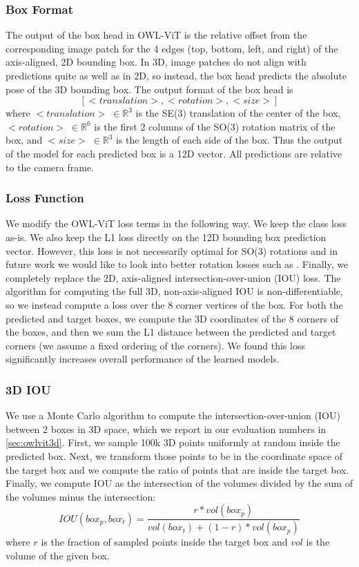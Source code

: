 \subsubsection{Box Format}
\label{app:owlvit3d_box_format}

The output of the box head in OWL-ViT is the relative offset from the corresponding image patch for the 4 edges (top, bottom, left, and right) of the axis-aligned, 2D bounding box.
In 3D, image patches do not align with predictions quite as well as in 2D, so instead, the box head predicts the absolute pose of the 3D bounding box.
The output format of the box head is
\[ [<translation>, <rotation>, <size>] \]
where $<translation> \; \in \mathbb{R}^3$ is the SE(3) translation of the center of the box, $<rotation> \; \in \mathbb{R}^6$ is the first 2 columns of the SO(3) rotation matrix of the box, and $<size> \; \in \mathbb{R}^3$ is the length of each side of the box.
Thus the output of the model for each predicted box is a 12D vector.
All predictions are relative to the camera frame.

\subsubsection{Loss Function}
\label{app:owlvit3d_loss}

We modify the OWL-ViT loss terms in the following way.
We keep the class loss as-is.
We also keep the L1 loss directly on the 12D bounding box prediction vector.
However, this loss is not necessarily optimal for SO(3) rotations and in future work we would like to look into better rotation losses such as \cite{Hertzberg2011}.
Finally, we completely replace the 2D, axis-aligned intersection-over-union (IOU) loss.
The algorithm for computing the full 3D, non-axis-aligned IOU is non-differentiable, so we instead compute a loss over the 8 corner vertices of the box.
For both the predicted and target boxes, we compute the 3D coordinates of the 8 corners of the boxes, and then we sum the L1 distance between the predicted and target corners (we assume a fixed ordering of the corners).
We found this loss significantly increases overall performance of the learned models.

\subsubsection{3D IOU}

We use a Monte Carlo algorithm to compute the intersection-over-union (IOU) between 2 boxes in 3D space, which we report in our evaluation numbers in \cref{sec:owlvit3d}.
First, we sample 100k 3D points uniformly at random inside the predicted box.
Next, we transform those points to be in the coordinate space of the target box and we compute the ratio of points that are inside the target box.
Finally, we compute IOU as the intersection of the volumes divided by the sum of the volumes minus the intersection:
\[IOU(box_p, box_t) = \frac{r * vol(box_p)}{vol(box_t) + (1 - r)*vol(box_p)} \]
where $r$ is the fraction of sampled points inside the target box and $vol$ is the volume of the given box.

